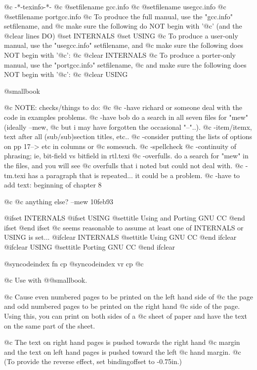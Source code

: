   @c -*-texinfo-*-
@c %
@setfilename gcc.info
@c @setfilename usegcc.info
@c @setfilename portgcc.info
@c To produce the full manual, use the "gcc.info" setfilename, and
@c make sure the following do NOT begin with '@c' (and the @clear lines DO)
@set INTERNALS
@set USING
@c To produce a user-only manual, use the "usegcc.info" setfilename, and
@c make sure the following does NOT begin with '@c':
@c @clear INTERNALS
@c To produce a porter-only manual, use the "portgcc.info" setfilename,
@c and make sure the following does NOT begin with '@c':
@c @clear USING

@smallbook

@c NOTE: checks/things to do:
@c 
@c -have richard or someone deal with the code in examples problems.
@c -have bob do a search in all seven files for "mew" (ideally --mew,
@c  but i may have forgotten the occasional "--"..).
@c -item/itemx, text after all (sub/sub)section titles, etc..
@c -consider putting the lists of options on pp 17--> etc in columns or
@c  somesuch. 
@c -spellcheck
@c -continuity of phrasing; ie, bit-field vs bitfield in rtl.texi
@c -overfulls.  do a search for "mew" in the files, and you will see
@c   overfulls that i noted but could not deal with.
@c -tm.texi has a paragraph that is repeated... it could be a problem.
@c -have to add text:  beginning of chapter 8

@c
@c anything else?                       --mew 10feb93



@ifset INTERNALS
@ifset USING
@settitle Using and Porting GNU CC
@end ifset
@end ifset
@c seems reasonable to assume at least one of INTERNALS or USING is set...
@ifclear INTERNALS
@settitle Using GNU CC
@end ifclear
@ifclear USING
@settitle Porting GNU CC
@end ifclear 

@syncodeindex fn cp
@syncodeindex vr cp
@c %

@c Use with @@smallbook.

@c Cause even numbered pages to be printed on the left hand side of
@c the page and odd numbered pages to be printed on the right hand
@c side of the page.  Using this, you can print on both sides of a
@c sheet of paper and have the text on the same part of the sheet.

@c The text on right hand pages is pushed towards the right hand
@c margin and the text on left hand pages is pushed toward the left
@c hand margin.  
@c (To provide the reverse effect, set bindingoffset to -0.75in.)

